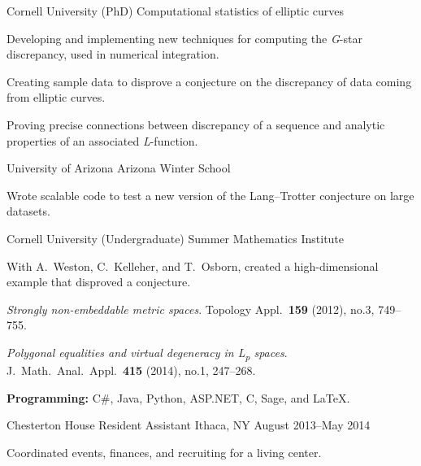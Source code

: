 \documentclass[11pt, letterpaper]{awesome-cv}
\begin{document}

\begin{cventries}

\cventry
	{Cornell University (PhD)}
	{Computational statistics of elliptic curves}
	{}
	{}
	{
		\begin{cvitems}
			\item{Developing and implementing new techniques for computing the \emph{G}-star discrepancy, used in numerical integration.}
			\item{Creating sample data to disprove a conjecture on the discrepancy of data coming from elliptic curves.}
			\item{Proving precise connections between discrepancy of a sequence and analytic properties of an associated \emph{L}-function.}
		\end{cvitems}
	}
		
\cventry
	{University of Arizona}
	{Arizona Winter School}
	{}
	{}
	{
		\begin{cvitems}
			\item{Wrote scalable code to test a new version of the Lang--Trotter conjecture on large datasets.}
		\end{cvitems}
	}
	
\cventry
	{Cornell University (Undergraduate)}
	{Summer Mathematics Institute}
	{}
	{}
	{
		\begin{cvitems}
			\item{With A.~Weston, C.~Kelleher, and T.~Osborn, created a high-dimensional example that disproved a conjecture.}
			\item{\emph{Strongly non-embeddable metric spaces}. Topology Appl.~\textbf{159} (2012), no.3, 749--755.}
			\item{\emph{Polygonal equalities and virtual degeneracy in L\textsubscript{p} spaces}. J.~Math.~Anal.~Appl.~\textbf{415} (2014), no.1, 247--268.}
		\end{cvitems}
	}
	
\end{cventries}






\begin{cvparagraph}

\textbf{Programming:} C\#, Java, Python, ASP.NET, C, Sage, and \LaTeX.
\end{cvparagraph}

\begin{cventries}
\cventry
	{Chesterton House}
	{Resident Assistant}
	{Ithaca, NY}
	{August 2013--May 2014}
	{
		\begin{cvitems}
			\item{Coordinated events, finances, and recruiting for a living center.}
		\end{cvitems}
	}
	
\end{cventries}
\end{document}
